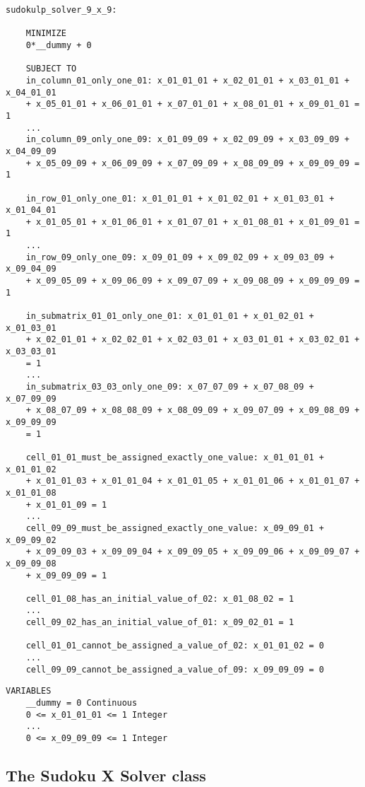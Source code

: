 \documentclass[12pt]{article}
\begin{document}
\begin{lstlisting}[caption={The objective function and constraints of SudokuLP}]
    sudokulp_solver_9_x_9:

    MINIMIZE
    0*__dummy + 0

    SUBJECT TO
    in_column_01_only_one_01: x_01_01_01 + x_02_01_01 + x_03_01_01 + x_04_01_01
    + x_05_01_01 + x_06_01_01 + x_07_01_01 + x_08_01_01 + x_09_01_01 = 1
    ...
    in_column_09_only_one_09: x_01_09_09 + x_02_09_09 + x_03_09_09 + x_04_09_09
    + x_05_09_09 + x_06_09_09 + x_07_09_09 + x_08_09_09 + x_09_09_09 = 1

    in_row_01_only_one_01: x_01_01_01 + x_01_02_01 + x_01_03_01 + x_01_04_01
    + x_01_05_01 + x_01_06_01 + x_01_07_01 + x_01_08_01 + x_01_09_01 = 1
    ...
    in_row_09_only_one_09: x_09_01_09 + x_09_02_09 + x_09_03_09 + x_09_04_09
    + x_09_05_09 + x_09_06_09 + x_09_07_09 + x_09_08_09 + x_09_09_09 = 1

    in_submatrix_01_01_only_one_01: x_01_01_01 + x_01_02_01 + x_01_03_01
    + x_02_01_01 + x_02_02_01 + x_02_03_01 + x_03_01_01 + x_03_02_01 + x_03_03_01
    = 1
    ...
    in_submatrix_03_03_only_one_09: x_07_07_09 + x_07_08_09 + x_07_09_09
    + x_08_07_09 + x_08_08_09 + x_08_09_09 + x_09_07_09 + x_09_08_09 + x_09_09_09
    = 1

    cell_01_01_must_be_assigned_exactly_one_value: x_01_01_01 + x_01_01_02
    + x_01_01_03 + x_01_01_04 + x_01_01_05 + x_01_01_06 + x_01_01_07 + x_01_01_08
    + x_01_01_09 = 1
    ...
    cell_09_09_must_be_assigned_exactly_one_value: x_09_09_01 + x_09_09_02
    + x_09_09_03 + x_09_09_04 + x_09_09_05 + x_09_09_06 + x_09_09_07 + x_09_09_08
    + x_09_09_09 = 1

    cell_01_08_has_an_initial_value_of_02: x_01_08_02 = 1
    ...
    cell_09_02_has_an_initial_value_of_01: x_09_02_01 = 1

    cell_01_01_cannot_be_assigned_a_value_of_02: x_01_01_02 = 0
    ...
    cell_09_09_cannot_be_assigned_a_value_of_09: x_09_09_09 = 0
\end{lstlisting}

\begin{lstlisting}[caption={The variables of SudokuLP}]
    VARIABLES
    __dummy = 0 Continuous
    0 <= x_01_01_01 <= 1 Integer
    ...
    0 <= x_09_09_09 <= 1 Integer
\end{lstlisting}

\pagebreak

\subsection{The Sudoku X Solver class}
\end{document}
